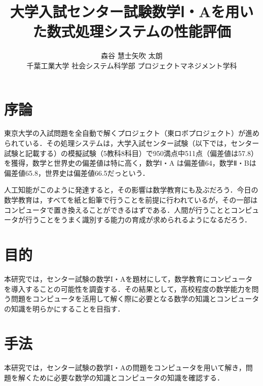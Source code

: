\documentclass[uplatex,twocolumn]{jsarticle}
\title{\vspace{-10mm}\Large{大学入試センター試験数学Ⅰ・Aを用いた数式処理システムの性能評価}\footnotemark[0]}
\author{\large{森谷 慧士\footnotemark[2]\qquad 矢吹 太朗}\\千葉工業大学 社会システム科学部 プロジェクトマネジメント学科\footnotemark[3]}
\date{}
\begin{document}
\twocolumn[\maketitle]

\begingroup
\def\thefootnote{\fnsymbol{footnote}}
\endgroup




\section{序論}

東京大学の入試問題を全自動で解くプロジェクト（東ロボプロジェクト）が進められている\cite{arai2014}．その処理システムは，大学入試センター試験（以下では，センター試験と記載する）の模擬試験（5教科8科目）で950満点中511点（偏差値は57.8）を獲得，数学と世界史の偏差値は特に高く，数学Ⅰ・A は偏差値64，数学Ⅱ・Bは偏差値65.8，世界史は偏差値66.5だっという\cite{tourobo}．

人工知能がこのように発達すると，その影響は数学教育にも及ぶだろう．今日の数学教育は，すべてを紙と鉛筆で行うことを前提に行われているが，その一部はコンピュータで置き換えることができるはずである．人間が行うこととコンピュータが行うことをうまく識別する能力の育成が求められるようになるだろう．



\section{目的}

本研究では，センター試験の数学I・Aを題材にして，数学教育にコンピュータを導入することの可能性を調査する．その結果として，高校程度の数学能力を問う問題をコンピュータを活用して解く際に必要となる数学の知識とコンピュータの知識を明らかにすることを目指す．





\section{手法}

本研究では，センター試験の数学I・Aの問題をコンピュータを用いて解き，問題を解くために必要な数学の知識とコンピュータの知識を確認する．
\end{document}
